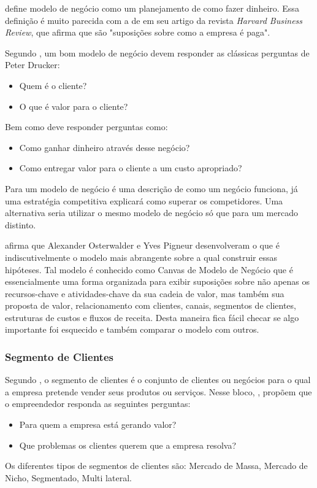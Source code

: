  define modelo de negócio como um planejamento de como fazer dinheiro. Essa definição é muito parecida com a de  em seu artigo da revista \textit{Harvard Business Review}, que afirma que são "suposições sobre como a empresa é paga".

Segundo , um bom modelo de negócio devem responder as clássicas perguntas de Peter Drucker:
\begin{itemize}
\item Quem é o cliente?
\item O que é valor para o cliente?
\end{itemize}
Bem como deve responder perguntas como:
\begin{itemize}
\item Como ganhar dinheiro através desse negócio?
\item Como entregar valor para o cliente a um custo apropriado?
\end{itemize}

Para  um modelo de negócio é uma descrição de como um negócio funciona, já uma estratégia competitiva explicará como superar os competidores. Uma alternativa seria utilizar o mesmo modelo de negócio só que para um mercado distinto.

 afirma que Alexander Osterwalder e Yves Pigneur desenvolveram o que é indiscutivelmente o modelo mais abrangente sobre a qual construir essas hipóteses. Tal modelo é conhecido como Canvas de Modelo de Negócio que é essencialmente uma forma organizada para exibir suposições sobre não apenas os recursos-chave e atividades-chave da sua cadeia de valor, mas também sua proposta de valor, relacionamento com clientes, canais, segmentos de clientes, estruturas de custos e fluxos de receita. Desta maneira fica fácil checar se algo importante foi esquecido e também  comparar o modelo com outros.

\subsubsection{Segmento de Clientes}
\label{cha:segmento_de_clientes}
Segundo , o segmento de clientes é o conjunto de clientes ou negócios para o qual a empresa pretende vender seus produtos ou serviços.
Nesse bloco, , propõem que o empreendedor responda as seguintes perguntas:
\begin{itemize}
\item Para quem a empresa está gerando valor?
\item Que problemas os clientes querem que a empresa resolva?
\end{itemize}
Os diferentes tipos de segmentos de clientes são: Mercado de Massa, Mercado de Nicho, Segmentado, Multi lateral.

